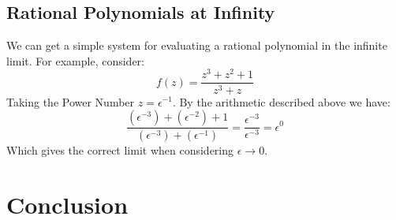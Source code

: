 \documentclass[acmsmall]{acmart}
\begin{document}
\subsection{Rational Polynomials at Infinity}
We can get a simple system for evaluating a rational polynomial in the infinite limit. For example, consider:
$$f(z) = \frac{z^3+z^2+1}{z^3+z}$$
Taking the Power Number $z = \epsilon^{-1}$. By the arithmetic described above we have:
$$\frac{(\epsilon^{-3})+(\epsilon^{-2})+1}{(\epsilon^{-3})+(\epsilon^{-1})} = \frac{\epsilon^{-3}}{\epsilon^{-3}}=\epsilon^0$$
Which gives the correct limit when considering $\epsilon \rightarrow 0$.


\section{Conclusion}
\end{document}
